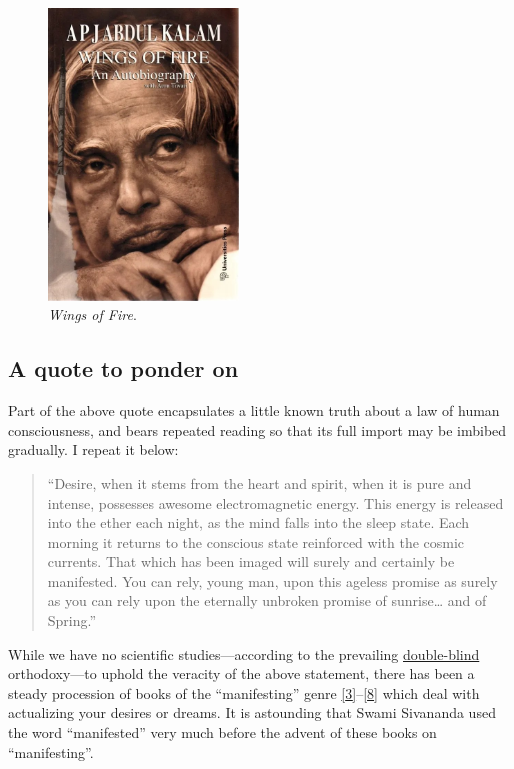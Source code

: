 \documentclass[
  a4paper,
]{article}
\begin{document}
\begin{figure}
\centering
\includegraphics[width=0.45\textwidth,height=\textheight]{images/Wings-of-Fire.jpg}
\caption{\emph{Wings of Fire}.}
\end{figure}

\hypertarget{a-quote-to-ponder-on}{%
\subsection{A quote to ponder on}\label{a-quote-to-ponder-on}}

Part of the above quote encapsulates a little known truth about a law of
human consciousness, and bears repeated reading so that its full import
may be imbibed gradually. I repeat it below:

\begin{quote}
``Desire, when it stems from the heart and spirit, when it is pure and
intense, possesses awesome electromagnetic energy. This energy is
released into the ether each night, as the mind falls into the sleep
state. Each morning it returns to the conscious state reinforced with
the cosmic currents. That which has been imaged will surely and
certainly be manifested. You can rely, young man, upon this ageless
promise as surely as you can rely upon the eternally unbroken promise of
sunrise\ldots{} and of Spring.''
\end{quote}

While we have no scientific studies---according to the prevailing
\href{https://dictionary.cambridge.org/dictionary/english/double-blind}{double-blind}
orthodoxy---to uphold the veracity of the above statement, there has
been a steady procession of books of the ``manifesting'' genre
\protect\hyperlink{ref-murphy2006}{{[}3{]}}--\protect\hyperlink{ref-ferraro2021}{{[}8{]}}
which deal with actualizing your desires or dreams. It is astounding
that Swami Sivananda used the word ``manifested'' very much before the
advent of these books on ``manifesting''.
\end{document}
